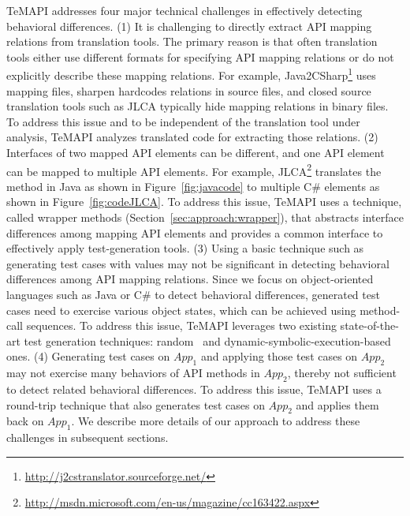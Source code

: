 TeMAPI addresses four major technical challenges in effectively detecting behavioral differences. (1) It is challenging to directly extract API mapping relations from translation tools. The primary reason is that often translation tools either use different formats for specifying API mapping relations or do not explicitly describe these mapping relations. For example, Java2CSharp\footnote{\url{http://j2cstranslator.sourceforge.net/}} uses mapping files, sharpen hardcodes relations in source files, and closed source translation tools such as JLCA typically hide mapping relations in binary files. To address this issue and to be independent of the translation tool under analysis, TeMAPI analyzes translated code for extracting those relations. (2) Interfaces of two mapped API elements can be different, and one API element can be mapped to multiple API elements. For example, JLCA\footnote{\url{http://msdn.microsoft.com/en-us/magazine/cc163422.aspx}} translates the  method in Java as shown in Figure~\ref{fig:javacode} to multiple C\# elements as shown in Figure~\ref{fig:codeJLCA}.
To address this issue, TeMAPI uses a technique, called wrapper methods (Section~\ref{sec:approach:wrapper}), that abstracts interface differences among mapping API elements and provides a common interface to effectively apply test-generation tools. (3) Using a basic technique such as generating test cases with  values may not be significant in detecting behavioral differences among API mapping relations. Since we focus on object-oriented languages such as Java or C\# to detect behavioral differences, generated test cases need to exercise various object states, which can be achieved using method-call sequences. To address this issue, TeMAPI leverages two existing state-of-the-art test generation techniques: random~\cite{pacheco2007feedback} and dynamic-symbolic-execution-based~\cite{koushik:cute, godefroid:dart, tillmann2008pex} ones. (4) Generating test cases on $App_1$ and applying those test cases on $App_2$ may not exercise many behaviors of API methods in $App_2$, thereby not sufficient to detect related behavioral differences. To address this issue, TeMAPI uses a round-trip technique that also generates test cases on $App_2$ and applies them back on $App_1$. We describe more details of our approach to address these challenges in subsequent sections.

